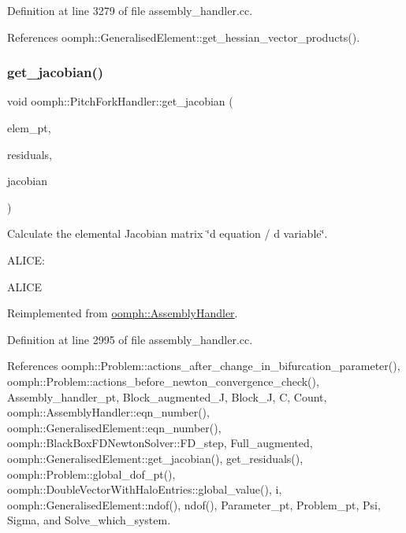 Definition at line 3279 of file assembly\+\_\+handler.\+cc.



References oomph\+::\+Generalised\+Element\+::get\+\_\+hessian\+\_\+vector\+\_\+products().

\mbox{\label{classoomph_1_1PitchForkHandler_aa6728813a099111bee2b6c79dec20fc4}} 
\subsubsection{\texorpdfstring{get\+\_\+jacobian()}{get\_jacobian()}}
{\footnotesize\ttfamily void oomph\+::\+Pitch\+Fork\+Handler\+::get\+\_\+jacobian (\begin{DoxyParamCaption}\item[{\hyperlink{classoomph_1_1GeneralisedElement}{Generalised\+Element} $\ast$const \&}]{elem\+\_\+pt,  }\item[{\hyperlink{classoomph_1_1Vector}{Vector}$<$ double $>$ \&}]{residuals,  }\item[{\hyperlink{classoomph_1_1DenseMatrix}{Dense\+Matrix}$<$ double $>$ \&}]{jacobian }\end{DoxyParamCaption})\hspace{0.3cm}{\ttfamily [virtual]}}



Calculate the elemental Jacobian matrix \char`\"{}d equation 
/ d variable\char`\"{}. 

A\+L\+I\+CE\+:

A\+L\+I\+CE 

Reimplemented from \hyperlink{classoomph_1_1AssemblyHandler_ad43c3d8760be0ba6ebee8d82509458e5}{oomph\+::\+Assembly\+Handler}.



Definition at line 2995 of file assembly\+\_\+handler.\+cc.



References oomph\+::\+Problem\+::actions\+\_\+after\+\_\+change\+\_\+in\+\_\+bifurcation\+\_\+parameter(), oomph\+::\+Problem\+::actions\+\_\+before\+\_\+newton\+\_\+convergence\+\_\+check(), Assembly\+\_\+handler\+\_\+pt, Block\+\_\+augmented\+\_\+J, Block\+\_\+J, C, Count, oomph\+::\+Assembly\+Handler\+::eqn\+\_\+number(), oomph\+::\+Generalised\+Element\+::eqn\+\_\+number(), oomph\+::\+Black\+Box\+F\+D\+Newton\+Solver\+::\+F\+D\+\_\+step, Full\+\_\+augmented, oomph\+::\+Generalised\+Element\+::get\+\_\+jacobian(), get\+\_\+residuals(), oomph\+::\+Problem\+::global\+\_\+dof\+\_\+pt(), oomph\+::\+Double\+Vector\+With\+Halo\+Entries\+::global\+\_\+value(), i, oomph\+::\+Generalised\+Element\+::ndof(), ndof(), Parameter\+\_\+pt, Problem\+\_\+pt, Psi, Sigma, and Solve\+\_\+which\+\_\+system.



